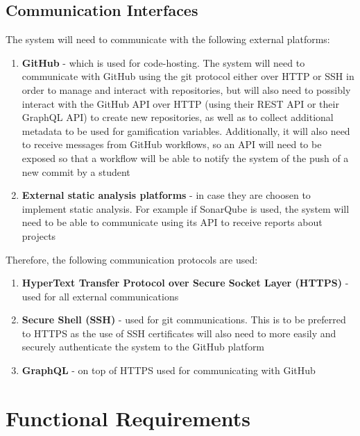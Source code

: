 \subsection{Communication Interfaces}
The system will need to communicate with the following external platforms:
\begin{enumerate}
    \item \textbf{GitHub} {-} which is used for code-hosting. The system will need to
          communicate with GitHub using the git protocol either over HTTP or SSH in order
          to manage and interact with repositories, but will also need to possibly interact
          with the GitHub API over HTTP (using their REST API or their GraphQL API) to
          create new repositories, as well as to collect additional metadata to be used
          for gamification variables. Additionally, it will also need to receive messages
          from GitHub workflows, so an API will need to be exposed so that a workflow
          will be able to notify the system of the push of a new commit by a student
    \item \textbf{External static analysis platforms} {-} in case they are choosen to
          implement static analysis. For example if SonarQube is used, the system will
          need to be able to communicate using its API to receive reports about projects
\end{enumerate}

Therefore, the following communication protocols are used:
\begin{enumerate}
    \item \textbf{HyperText Transfer Protocol over Secure Socket Layer (HTTPS)} {-} used
          for all external communications
    \item \textbf{Secure Shell (SSH)} {-} used for git communications. This is to be
          preferred to HTTPS as the use of SSH certificates will also need to more easily
          and securely authenticate the system to the GitHub platform
    \item \textbf{GraphQL} {-} on top of HTTPS used for communicating with GitHub
\end{enumerate}

\section{Functional Requirements}

